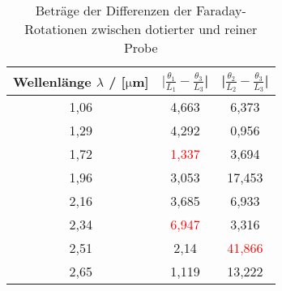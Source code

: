 \begin{table}

  \centering
\begin{tabular}{c|c|c}

  \toprule
Wellenlänge $\lambda$ / [$\si{\micro}$m] & $|\frac{\theta_1}{L_1}-\frac{\theta_3}{L_3}$| & |$\frac{\theta_2}{L_2}-\frac{\theta_3}{L_3}$| \\

\midrule
1,06 & 4,663 &  6,373 \\

1,29 & 4,292 &  0,956 \\

1,72 & \textcolor{red}{1,337} &  3,694 \\

1,96 & 3,053 & 17,453 \\

2,16 & 3,685 &  6,933 \\

2,34 & \textcolor{red}{6,947} &  3,316 \\

2,51 & 2,14  & \textcolor{red}{41,866} \\

2,65 & 1,119 & 13,222 \\
\bottomrule

\end{tabular}
\caption{Beträge der Differenzen der Faraday-Rotationen zwischen dotierter und reiner Probe}

\label{tab:difftab}
\end{table}

